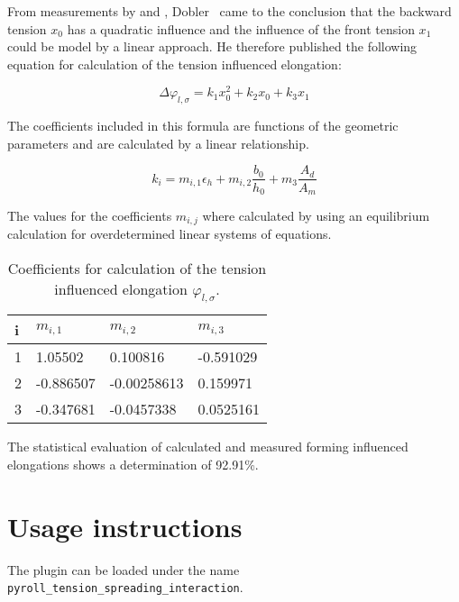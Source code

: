 \documentclass[11pt]{PyRollDocs}
\begin{document}
    From measurements by \textcite{Nikkilä1977} and \textcite{Treis1968}, Dobler~\cite{Dobler1998} came to the conclusion that the backward tension $x_0$ has a quadratic influence and the influence of the front tension $x_1$ could be model by a linear approach.
    He therefore published the following equation for calculation of the tension influenced elongation:

    \begin{equation}
        \Delta \varphi_{l, \sigma} = k_1 x_0^2 + k_2 x_0 + k_3 x_1
        \label{eq:dobler-model}
    \end{equation}

    The coefficients included in this formula are functions of the geometric parameters and are calculated by a linear relationship.

    \begin{equation}
        k_i = m_{i,1} \epsilon_h + m_{i,2} \frac{b_0}{h_0} + m_3 \frac{A_d}{A_m}
        \label{eq:dobler-coefficients}
    \end{equation}

    The values for the coefficients $m_{i,j}$ where calculated by \textcite{Dobler1998} using an equilibrium calculation for overdetermined linear systems of equations.

    \begin{table}
        \centering
        \caption{Coefficients for calculation of the tension influenced elongation $\varphi_{l, \sigma}$.}
        \label{tab:dobler-coefficients}
        \begin{tabular}{llll}
            \toprule
            i & $m_{i,1}$ & $m_{i,2}$   & $m_{i,3}$ \\
            \midrule
            1 & 1.05502   & 0.100816    & -0.591029 \\
            2 & -0.886507 & -0.00258613 & 0.159971  \\
            3 & -0.347681 & -0.0457338  & 0.0525161 \\
            \bottomrule
        \end{tabular}
    \end{table}

    The statistical evaluation of calculated and measured forming influenced elongations shows a determination of 92.91\%.


    \section{Usage instructions}\label{sec:usage-instructions}
    The plugin can be loaded under the name \texttt{pyroll\_tension\_spreading\_interaction}.
\end{document}
